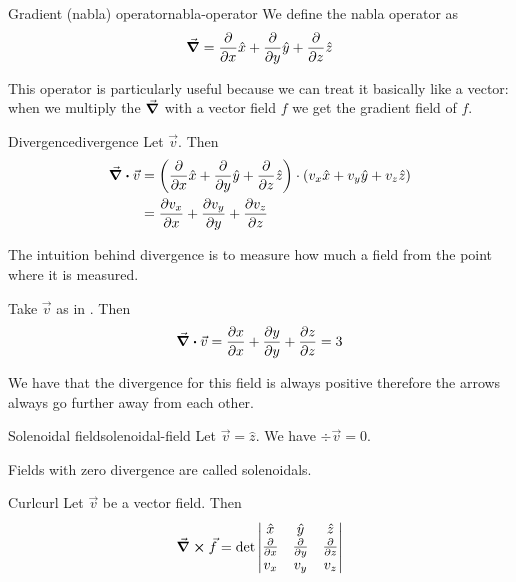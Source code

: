 \documentclass[12pt]{extarticle}
\begin{document}
\begin{definition}{Gradient (nabla) operator}{nabla-operator}
	We define the nabla operator as
	\begin{equation}
		\grad = \pdv{}{x} \hat{x} + \pdv{}{y} \hat{y} + \pdv{}{z} \hat{z}
	\end{equation}
\end{definition}

This operator is particularly useful because we can treat it basically like a vector: when we multiply the $\grad$ with a vector field $f$ we get the gradient field of $f$.

\begin{definition}{Divergence}{divergence}
	Let $\vec v$. Then
	\begin{align}
		\div \vec v & = \left( \pdv{}{x} \hat{x} + \pdv{}{y} \hat{y} + \pdv{}{z} \hat{z} \right) \cdot \left( v_x \hat x + v_y \hat y + v_z \hat z\right) \\
		            & = \pdv{v_x}{x} + \pdv{v_y}{y} + \pdv{v_z}{z}
	\end{align}
\end{definition}

The intuition behind divergence is to measure how much a field  from the point where it is measured.

\begin{example}{}{}
	Take $\vec v$ as in . Then
	\begin{equation}
		\div \vec v = \pdv{x}{x} + \pdv{y}{y} + \pdv{z}{z} = 3
	\end{equation}

	We have that the divergence for this field is always positive therefore the arrows always go further away from each other.
\end{example}

\begin{example}{Solenoidal field}{solenoidal-field}
	Let $\vec v = \hat z$. We have $\div \vec v = 0$.

	Fields with zero divergence are called solenoidals.
\end{example}

\begin{definition}{Curl}{curl}
	Let $\vec v$ be a vector field. Then
	\begin{equation}
		\curl \vec f = \det\begin{vmatrix}
			\hat x    & \hat y    & \hat z    \\
			\pdv{}{x} & \pdv{}{y} & \pdv{}{z} \\
			v_x       & v_y       & v_z
		\end{vmatrix}
	\end{equation}
\end{definition}
\end{document}
